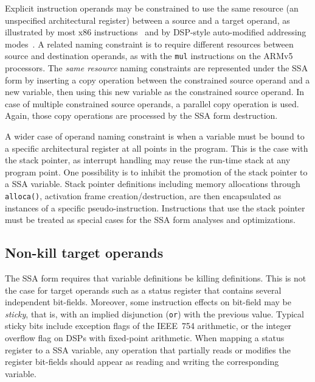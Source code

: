 Explicit instruction operands may be constrained to use the same resource (an
unspecified architectural register) between a source and a target operand, as
illustrated by most x86 instructions~\cite{Shanley:2010:Book} and by DSP-style auto-modified addressing
modes~\cite{Lee:2003:TODAES}.  A related naming constraint is to require different resources between
source and destination operands, as with the \texttt{mul} instructions on the ARMv5 processors. The \emph{same
resource} naming constraints are represented under the SSA form by inserting a
copy operation between the constrained source operand and a new variable, then
using this new variable as the constrained source operand. In case of multiple
constrained source operands, a parallel copy operation is used.  Again, those
copy operations are processed by the SSA form destruction.

A wider case of operand naming constraint is when a variable must be bound to a
specific architectural register at all points in the program. This is the case
with the stack pointer, as interrupt handling may reuse the run-time stack at
any program point.  One possibility is to inhibit the promotion of the stack
pointer to a SSA variable.  Stack pointer definitions including memory
allocations through \verb|alloca()|, activation frame creation/destruction, are
then encapsulated as instances of a specific pseudo-instruction. Instructions
that use the stack pointer must be treated as special cases for the SSA form
analyses and optimizations.

\subsection{Non-kill target operands} \label{sec:non-kill-target}

The SSA form requires that variable definitions be killing definitions. This is not the case
for target operands such as a status register that contains several independent
bit-fields. Moreover, some instruction effects on bit-field may be \emph{sticky},
that is, with an implied disjunction (\texttt{or}) with the previous value. Typical sticky bits include
exception flags of the IEEE~754 arithmetic, or the integer overflow flag on DSPs
with fixed-point arithmetic. When mapping a status register to a SSA variable,
any operation that partially reads or modifies the register bit-fields should
appear as reading and writing the corresponding variable.

